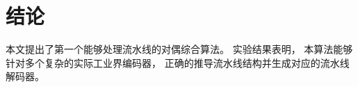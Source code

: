 %
%
%

\section{结论}\label{sec_conclude_chap4}

本文提出了第一个能够处理流水线的对偶综合算法。
实验结果表明，
本算法能够针对多个复杂的实际工业界编码器，
正确的推导流水线结构并生成对应的流水线解码器。